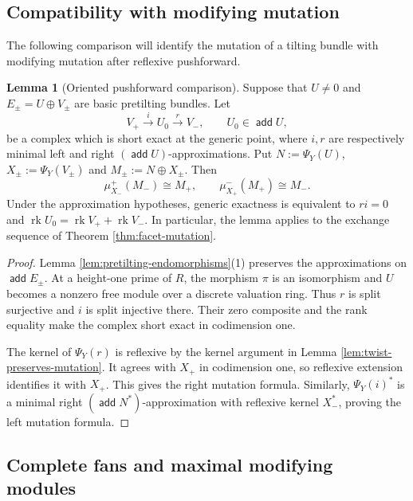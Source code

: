\documentclass[a4paper,reqno]{amsart}
\DeclareMathOperator{\add}{\mathsf{add}}
\DeclareMathOperator{\rk}{rk}
\theoremstyle{definition}
\newtheorem{Lem}[Thm]{Lemma}
\begin{document}
\subsection{Compatibility with modifying mutation}\label{sec:oriented-modifying-mutation}

The following comparison will identify the mutation of a tilting bundle with modifying mutation after reflexive pushforward.

\begin{Lem}[Oriented pushforward comparison]\label{lem:oriented-pushforward-mutation}
Suppose that $U\ne0$ and $E_\pm=U\oplus V_\pm$ are basic pretilting bundles. Let
\[
V_+\xrightarrow{i}U_0\xrightarrow{r}V_-,
\qquad U_0\in\add U,
\]
be a complex which is short exact at the generic point, where $i,r$ are respectively minimal left and right $(\add U)$-approximations. Put $N:=\Psi_Y(U)$, $X_\pm:=\Psi_Y(V_\pm)$ and $M_\pm:=N\oplus X_\pm$. Then
\[
\mu_{X_-}^+(M_-)\cong M_+,\qquad
\mu_{X_+}^-(M_+)\cong M_-.
\]
Under the approximation hypotheses, generic exactness is equivalent to $ri=0$ and $\rk U_0=\rk V_++\rk V_-$. In particular, the lemma applies to the exchange sequence of Theorem \ref{thm:facet-mutation}.
\end{Lem}
\begin{proof}
Lemma \ref{lem:pretilting-endomorphisms}(1) preserves the approximations on $\add E_\pm$. At a height-one prime of $R$, the morphism $\pi$ is an isomorphism and $U$ becomes a nonzero free module over a discrete valuation ring. Thus $r$ is split surjective and $i$ is split injective there. Their zero composite and the rank equality make the complex short exact in codimension one.

The kernel of $\Psi_Y(r)$ is reflexive by the kernel argument in Lemma \ref{lem:twist-preserves-mutation}. It agrees with $X_+$ in codimension one, so reflexive extension identifies it with $X_+$. This gives the right mutation formula. Similarly, $\Psi_Y(i)^*$ is a minimal right $(\add N^*)$-approximation with reflexive kernel $X_-^*$, proving the left mutation formula.
\end{proof}

\subsection{Complete fans and maximal modifying modules}\label{sec:complete-fan-realization}
\end{document}
